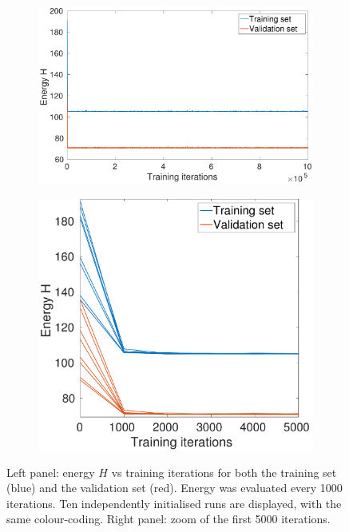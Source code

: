\documentclass[12pt,titlepage]{article}
\begin{document}
\vspace*{-0.5cm}
\begin{figure}[H]
\centering
    \begin{subfigure}[b]{0.57\textwidth}
        \includegraphics[width=\textwidth]{../Figures/noHL_energy.pdf}
        \caption{}
    \end{subfigure} %
    \hfill %
    \begin{subfigure}[b]{0.39\textwidth}
        \includegraphics[width=\textwidth]{../Figures/noHL_energy_part.pdf}
        \caption{}
    \end{subfigure} %
    \vspace*{-0.2cm}
\caption{\footnotesize Left panel: energy $H$ vs training iterations for both the training set (blue) and the validation set (red). Energy was evaluated every 1000 iterations. Ten independently initialised runs are displayed, with the same colour-coding. Right panel: zoom of the first 5000 iterations.}
\label{fig:2a}
\end{figure}
\end{document}
